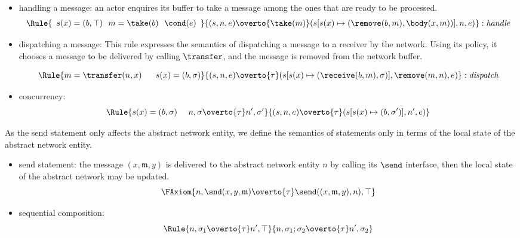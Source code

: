 \begin{itemize}

\item handling a message: an actor enquires its buffer to take a message among the ones that are ready to be processed. %
\[
\Rule{\begin{array}{c}s(x)=(b,\top)~~m= \take(b)~~\cond(e)%
\end{array}}{(s,n,e)\overto{\take(m)}(s[s(x)\mapsto (\remove(b,m),\body(x,m))],n,e)}:{\it handle}
\] 




\item dispatching a message: This rule expresses the semantics of dispatching a message to a receiver by the network. Using its policy, it chooses a message to be delivered by calling $\transfer$, and the message is removed from the network buffer.

\[\Rule{m=\transfer(n,x) ~~~ ~~s(x)=(b,\sigma)}{(s,n,e)\overto{\tau}(s[s(x)\mapsto (\receive(b,m),\sigma)],\remove(m,n),e)} :{\it dispatch}
\]

\item concurrency: 
\[
\Rule{s(x)=(b,\sigma)~~~~n,\sigma\overto{\tau}n',\sigma'}{(s,n,e)\overto{\tau}(s[s(x)\mapsto (b,\sigma')],n',e)}
 \]    
\end{itemize}

As the send statement only affects the abstract network entity, we define the semantics of statements only in terms of the local state of the abstract network entity. %

\begin{itemize}
\item send statement: the message $(x,\mathfrak{m},y)$ is delivered to the abstract network entity $n$ by calling its $\send$ interface, then the local state of the abstract network may be updated. 
\[
\FAxiom{n,\snd(x,y,\mathfrak{m}) \overto{\tau} \send((x,\mathfrak{m},y),n),\top} %
\]  
\item sequential composition: %
\[
\Rule{n,\sigma_1\overto{\tau}n',\top}{n,\sigma_1;\sigma_2\overto{\tau}n',\sigma_2}
\]
\end{itemize}

